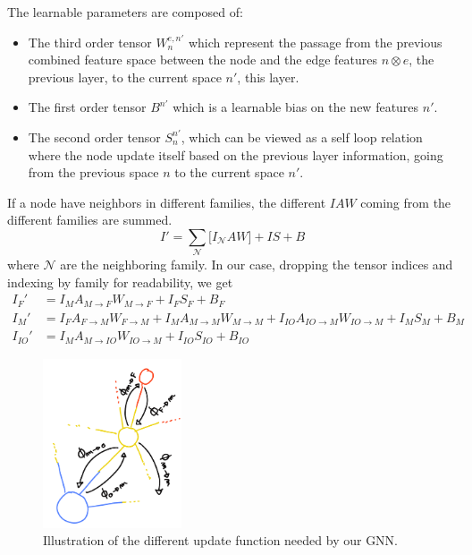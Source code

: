 \documentclass[../main.tex]{subfiles}
\begin{document}
The learnable parameters are composed of:
\begin{itemize}
  \item The third order tensor $W_n^{e,n'}$ which represent the passage from the previous combined feature space between the node and the edge features $n \otimes e$, the previous layer, to the current space $n'$, this layer.
  \item The first order tensor $B^{n'}$ which is a learnable bias on the new features $n'$.
  \item The second order tensor $S^{n'}_n$, which can be viewed as a self loop relation where the node update itself based on the previous layer information, going from the previous space $n$ to the current space $n'$.
\end{itemize}

If a node have neighbors in different families, the different $IAW$ coming from the different families are summed.
\begin{equation}
  \label{eq:jgnn:multi_fam}
  I' = \sum_\mathcal{N} \bigg[ I_{\mathcal{N}}AW \bigg] + IS + B
\end{equation}
where $\mathcal{N}$ are the neighboring family.
In our case, dropping the tensor indices and indexing by family for readability, we get
\begin{align}
  I_F' &= I_M A_{M \rightarrow F} W_{M \rightarrow F} + I_F S_F + B_F \\
  I_M' &= I_F A_{F \rightarrow M} W_{F \rightarrow M} + I_M A_{M \rightarrow M} W_{M \rightarrow M} + I_{IO} A_{IO \rightarrow M} W_{IO \rightarrow M} + I_M S_M + B_M \\
  I_{IO}' &= I_M A_{M \rightarrow IO} W_{IO \rightarrow M} + I_{IO} S_{IO} + B_{IO}
\end{align}

\begin{figure}
  \centering
  \includegraphics[height=5cm]{images/jgnn/mp_illus.png}
  \caption{Illustration of the different update function needed by our GNN.}
  \label{fig:jgnn:mp_ill}
\end{figure}
\end{document}
